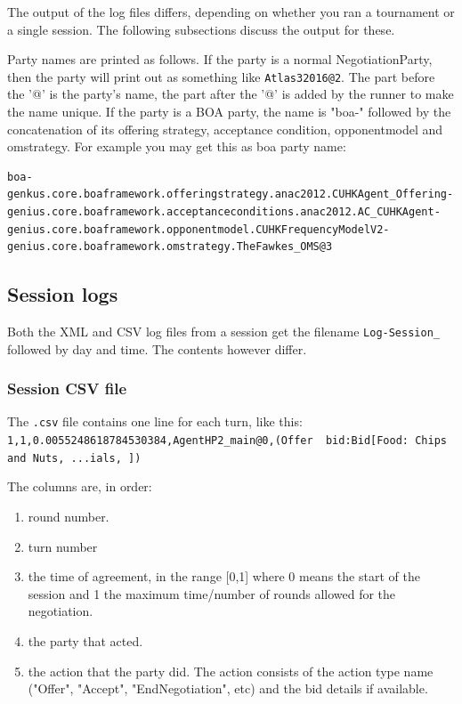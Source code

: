 \documentclass[]{llncs}
\begin{document}
The output of the log files differs, depending on whether you ran a tournament or a single session. The following subsections discuss the output for these.

Party names are printed as follows. If the party is a normal NegotiationParty, then the party will print out as something like \verb|Atlas32016@2|. The part before the '@' is the party's name, the part after the '@' is added by the runner to make the name unique. If the party is a BOA party, the name is "boa-" followed by the concatenation of its offering strategy, acceptance condition, opponentmodel and omstrategy. For example you may get this as boa party name:

\begin{verbatim}
boa-genkus.core.boaframework.offeringstrategy.anac2012.CUHKAgent_Offering-
genius.core.boaframework.acceptanceconditions.anac2012.AC_CUHKAgent-
genius.core.boaframework.opponentmodel.CUHKFrequencyModelV2-
genius.core.boaframework.omstrategy.TheFawkes_OMS@3
\end{verbatim}


\subsection{Session logs}
Both the XML and CSV log files from a session get the filename \verb|Log-Session_| followed by day and time. The contents however differ.

\subsubsection{Session CSV file}
 The \verb|.csv| file contains one line for each turn, like this:
\verb|1,1,0.0055248618784530384,AgentHP2_main@0,(Offer  bid:Bid[Food: Chips and Nuts, ...ials, ])|

The columns are, in order:
\begin{enumerate}
\item round number.
\item turn number
\item the time of agreement, in the range [0,1] where 0 means the start of the session and 1 the maximum time/number of rounds allowed for the negotiation. 
\item the party that acted.
\item the action that the party did. The action consists of the action type name ("Offer", "Accept", "EndNegotiation", etc) and the bid details if available.
\end{enumerate}
\end{document}
